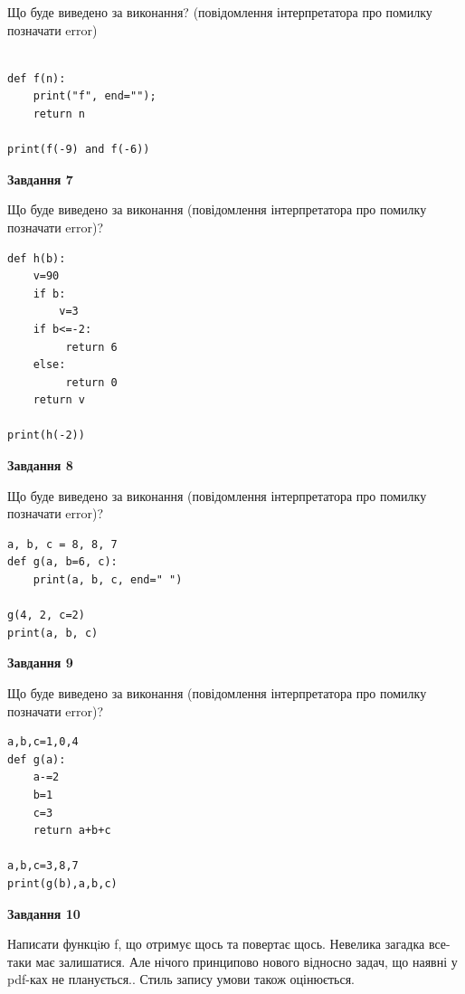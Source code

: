 \documentclass[12pt, ukrainian]{article}
\begin{document}
{\begin {large}
Що буде виведено за виконання? (повідомлення інтерпретатора про помилку позначати error)\par
\begin{verbatim}

def f(n):
    print("f", end="");
    return n

print(f(-9) and f(-6))
\end{verbatim}

{\begin {center}\textbf{Завдання 7}\end {center}}

Що буде виведено за виконання (повідомлення інтерпретатора про помилку позначати error)?\par
\begin{verbatim}
def h(b):
    v=90
    if b: 
        v=3
    if b<=-2:
         return 6
    else:
         return 0
    return v

print(h(-2))
\end{verbatim}

{\begin {center}\textbf{Завдання 8}\end {center}}

Що буде виведено за виконання (повідомлення інтерпретатора про помилку позначати error)?\par
\begin{verbatim}
a, b, c = 8, 8, 7
def g(a, b=6, c):
    print(a, b, c, end=" ")

g(4, 2, c=2)
print(a, b, c)
\end{verbatim}

{\begin {center}\textbf{Завдання 9}\end {center}}

Що буде виведено за виконання (повідомлення інтерпретатора про помилку позначати error)?\par
\begin{verbatim}
a,b,c=1,0,4
def g(a):
    a-=2
    b=1
    c=3
    return a+b+c

a,b,c=3,8,7
print(g(b),a,b,c)
\end{verbatim}

{\begin {center}\textbf{Завдання 10}\end {center}}


Написати функцiю f, що отримує щось та повертає щось. Невелика загадка все-таки має залишатися. Але нічого принципово нового відносно задач, що наявні у pdf-ках не планується.. Стиль запису умови також оцінюється.\par
\end {large}}
\newpage
\end{document}
